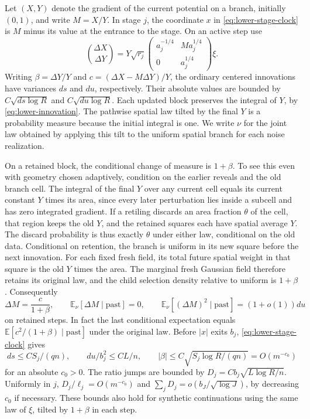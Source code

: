 \documentclass[11pt]{article}
\newcommand{\1}{\mathbf{1}}
\numberwithin{equation}{section}
\newcommand{\E}{\mathbb E}
\begin{document}
Let \((X,Y)\) denote the gradient of the current potential on
a branch, initially \((0,1)\), and write \(M=X/Y\).
In stage \(j\), the coordinate \(x\) in \eqref{eq:lower-stage-clock} is \(M\) minus its
value at the entrance to the stage. On an active step use
\[
 \binom{\Delta X}{\Delta Y}
  =Y\sqrt{r_j}
   \begin{pmatrix}a_j^{-1/4}&M a_j^{1/4}\\0&a_j^{1/4}\end{pmatrix}\xi .
\]
Writing \(\beta=\Delta Y/Y\) and
\(c=(\Delta X-M\Delta Y)/Y\), the ordinary centered innovations
have variances \(ds\) and \(du\), respectively. Their absolute
values are bounded by \(C\sqrt{ds\log R}\) and
\(C\sqrt{du\log R}\). Each updated block preserves the integral
of \(Y\), by \eqref{eq:lower-innovation}. The pathwise spatial law tilted by the final
\(Y\) is a probability measure because the initial integral is
one. We write \(\nu\) for the joint law obtained by applying this
tilt to the uniform spatial branch for each noise realization.

On a retained block, the conditional change of measure is
\(1+\beta\). To see this even with geometry chosen adaptively,
condition on the earlier reveals and the old branch cell. The
integral of the final \(Y\) over any current cell equals its
current constant \(Y\) times its area, since every later
perturbation lies inside a subcell and has zero integrated
gradient. If a retiling discards an area fraction \(\theta\)
of the cell, that region keeps the old \(Y\), and the retained
squares each have spatial average \(Y\). The discard probability
is thus exactly \(\theta\) under either law, conditional on the
old data. Conditional on retention, the branch is uniform in
its new square before the next innovation. For each fixed fresh
field, its total future spatial weight in that square is the
old \(Y\) times the area. The marginal fresh Gaussian field
therefore retains its original law, and the child selection
density relative to uniform is \(1+\beta\). Consequently
\[
 \Delta M=\frac{c}{1+\beta},\qquad
 \E_\nu[\Delta M\mid\mathrm{past}]=0,\qquad
 \E_\nu[(\Delta M)^2\mid\mathrm{past}]=(1+o(1))du
\]
on retained steps. In fact the last conditional expectation
equals \(\E[c^2/(1+\beta)\mid\mathrm{past}]\) under the original law.
Before \(|x|\) exits \(b_j\), \eqref{eq:lower-stage-clock} gives
\[
 ds\le C S_j/(q n),\qquad
 du/b_j^2\le C L/n,\qquad
 |\beta|\le C\sqrt{S_j\log R/(q n)}=O(m^{-c_0})
\]
for an absolute \(c_0>0\). The ratio jumps are bounded by
\(D_j=C b_j\sqrt{L\log R/n}\). Uniformly in \(j\),
\(D_j/\ell_j=O(m^{-c_0})\) and
\(\sum_j D_j=o(b_J/\sqrt{\log J})\), by decreasing \(c_0\)
if necessary. These bounds also hold for synthetic continuations
using the same law of \(\xi\), tilted by \(1+\beta\) in each step.
\end{document}
